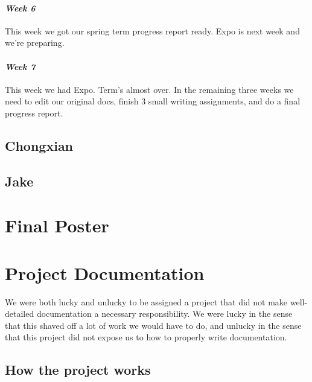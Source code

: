 \documentclass[onecolumn, draftclsnofoot,10pt, compsoc]{IEEEtran}
\begin{document}
\paragraph{\emph{Week 6}}
This week we got our spring term progress report ready. Expo is next week and we're preparing.
\paragraph{\emph{Week 7}}
This week we had Expo. Term's almost over. In the remaining three weeks we need to edit our original docs, finish 3 small writing assignments, and do a final progress report.
\subsection{Chongxian}

\subsection{Jake}

\newpage
\section{Final Poster}

\newpage

\section{Project Documentation}
We were both lucky and unlucky to be assigned a project that did not make well-detailed documentation a necessary responsibility. We were lucky in the sense that this shaved off a lot of work we would have to do, and unlucky in the sense that this project did not expose us to how to properly write documentation.
\subsection{How the project works}
\end{document}
